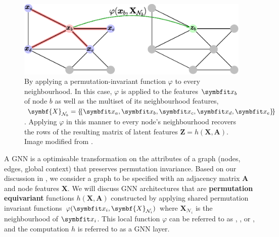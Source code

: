 \begin{figure}[th]
    \centering
    \includegraphics[width=\linewidth]{chapters/assets/graph-figs/GC_GDL.eps}
    \caption{By applying a permutation-invariant function $\varphi$ to every neighbourhood. In this case, $\varphi$ is applied to the features $\bfitx_b$ of node $b$ as well as the multiset  of its neighbourhood features, $\symbf{X}_{\mathcal{N}_b} = \ldblbrace\bfitx_a, \bfitx_b, \bfitx_c, \bfitx_d, \bfitx_e\rdblbrace$. Applying $\varphi$ in this manner to every node's neighbourhood recovers the rows of the resulting matrix of latent features $\symbf{Z}=h(\symbf{X}, \symbf{A})$. Image modified from \parencite{Bronstein2021}.}
    \label{fig:gc_gdl}
\end{figure}%

A GNN is a optimisable transformation on the attributes of a graph (nodes, edges, global context) that preserves permutation invariance.
Based on our discussion in , we consider a graph to be specified with an adjacency matrix $\symbf{A}$ and node features $\symbf{X}$. We will discuss GNN architectures that are \textbf{permutation equivariant} functions $h(\symbf{X}, \symbf{A})$ constructed by applying shared permutation invariant functions $\varphi(\bfitx_i, \symbf{X}_{\mathcal{N}_i})$ where $\symbf{X}_{\mathcal{N}_i}$ is the neighbourhood of $\bfitx_i$. This local function $\varphi$ can be referred to as , , or , and the computation $h$ is referred to as a GNN layer.

